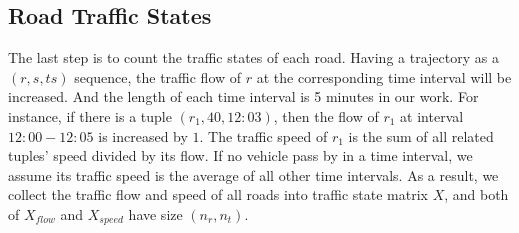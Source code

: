\subsection{Road Traffic States}
The last step is to count the traffic states of each road. Having a trajectory as a $(r, s, ts)$ sequence, the traffic flow of $r$ at the corresponding time interval will be increased. And the length of each time interval is 5 minutes in our work. For instance, if there is a tuple $(r_1, 40, 12:03)$, then the flow of $r_1$ at interval $12:00 - 12:05$ is increased by $1$. The traffic speed of $r_1$ is the sum of all related tuples' speed divided by its flow. If no vehicle pass by in a time interval, we assume its traffic speed is the average of all other time intervals. As a result, we collect the traffic flow and speed of all roads into traffic state matrix $X$, and both of $X_{flow}$ and $X_{speed}$ have size $(n_r, n_t)$.
